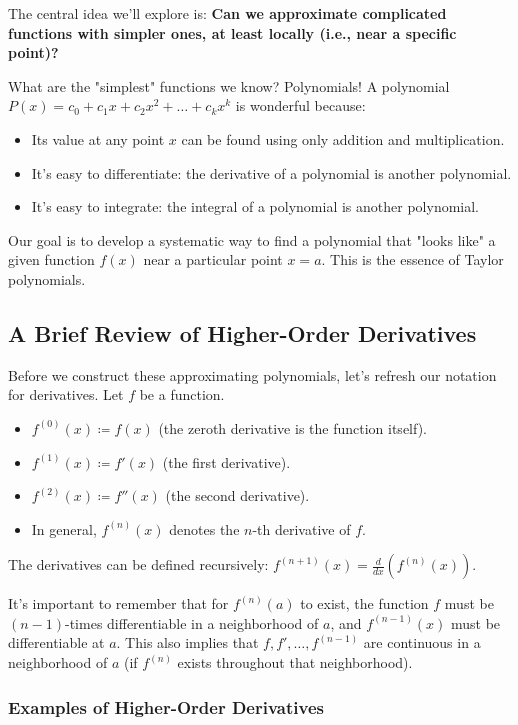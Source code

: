 \documentclass[11pt, a4paper]{article}
\theoremstyle{plain}
\theoremstyle{definition}
\theoremstyle{remark}
\begin{document}
The central idea we'll explore is: \textbf{Can we approximate complicated functions with simpler ones, at least locally (i.e., near a specific point)?}

What are the "simplest" functions we know? Polynomials!
A polynomial $P(x) = c_0 + c_1 x + c_2 x^2 + \dots + c_k x^k$ is wonderful because:
\begin{itemize}
    \item Its value at any point $x$ can be found using only addition and multiplication.
    \item It's easy to differentiate: the derivative of a polynomial is another polynomial.
    \item It's easy to integrate: the integral of a polynomial is another polynomial.
\end{itemize}
Our goal is to develop a systematic way to find a polynomial that "looks like" a given function $f(x)$ near a particular point $x=a$. This is the essence of Taylor polynomials.

\subsection{A Brief Review of Higher-Order Derivatives}

Before we construct these approximating polynomials, let's refresh our notation for derivatives.
Let $f$ be a function.
\begin{itemize}
    \item $f^{(0)}(x) \coloneqq f(x)$ (the zeroth derivative is the function itself).
    \item $f^{(1)}(x) \coloneqq f'(x)$ (the first derivative).
    \item $f^{(2)}(x) \coloneqq f''(x)$ (the second derivative).
    \item In general, $f^{(n)}(x)$ denotes the $n$-th derivative of $f$.
\end{itemize}
The derivatives can be defined recursively: $f^{(n+1)}(x) = \frac{d}{dx} \left( f^{(n)}(x) \right)$.

It's important to remember that for $f^{(n)}(a)$ to exist, the function $f$ must be $(n-1)$-times differentiable in a neighborhood of $a$, and $f^{(n-1)}(x)$ must be differentiable at $a$. This also implies that $f, f', \dots, f^{(n-1)}$ are continuous in a neighborhood of $a$ (if $f^{(n)}$ exists throughout that neighborhood).

\subsubsection{Examples of Higher-Order Derivatives}
\end{document}
